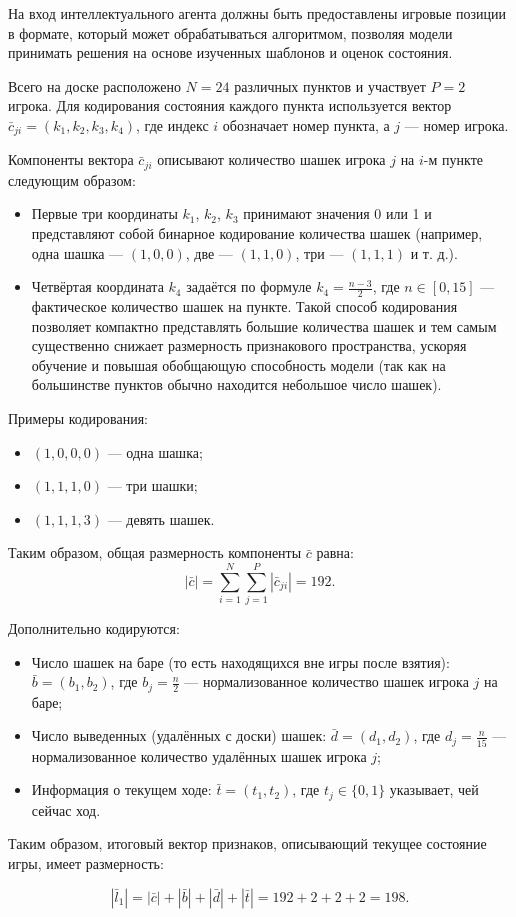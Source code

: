 На вход интеллектуального агента должны быть предоставлены игровые позиции в формате, который может обрабатываться алгоритмом, позволяя модели принимать решения на основе изученных шаблонов и оценок состояния.

Всего на доске расположено $N = 24$ различных пунктов и участвует $P = 2$ игрока. Для кодирования состояния каждого пункта используется вектор $\bar{c}_{ji} = (k_1, k_2, k_3, k_4)$, где индекс $i$ обозначает номер пункта, а $j$ --- номер игрока.

Компоненты вектора $\bar{c}_{ji}$ описывают количество шашек игрока $j$ на $i$-м пункте следующим образом:
\begin{itemize}
    \item Первые три координаты $k_1$, $k_2$, $k_3$ принимают значения 0 или 1 и представляют собой бинарное кодирование количества шашек (например, одна шашка --- $(1, 0, 0)$, две --- $(1, 1, 0)$, три --- $(1, 1, 1)$ и т. д.).
    \item Четвёртая координата $k_4$ задаётся по формуле $k_4 = \frac{n - 3}{2}$, где $n \in [0, 15]$ --- фактическое количество шашек на пункте. Такой способ кодирования позволяет компактно представлять большие количества шашек и тем самым существенно снижает размерность признакового пространства, ускоряя обучение и повышая обобщающую способность модели (так как на большинстве пунктов обычно находится небольшое число шашек).
\end{itemize}

Примеры кодирования:
\begin{itemize}
    \item $(1, 0, 0, 0)$ --- одна шашка;
    \item $(1, 1, 1, 0)$ --- три шашки;
    \item $(1, 1, 1, 3)$ --- девять шашек.
\end{itemize}

Таким образом, общая размерность компоненты $\bar{c}$ равна:
\begin{equation}
    |\bar{c}| = \sum\limits_{i=1}^{N} \sum\limits_{j=1}^{P} |\bar{c}_{ji}| = 192.
\end{equation}

Дополнительно кодируются:
\begin{itemize}
    \item Число шашек на баре (то есть находящихся вне игры после взятия): $\bar{b} = (b_1, b_2)$, где $b_j = \frac{n}{2}$ --- нормализованное количество шашек игрока $j$ на баре;
    \item Число выведенных (удалённых с доски) шашек: $\bar{d} = (d_1, d_2)$, где $d_j = \frac{n}{15}$ --- нормализованное количество удалённых шашек игрока $j$;
    \item Информация о текущем ходе: $\bar{t} = (t_1, t_2)$, где $t_j \in \{0, 1\}$ указывает, чей сейчас ход.
\end{itemize}

Таким образом, итоговый вектор признаков, описывающий текущее состояние игры, имеет размерность:

\begin{equation}
    |\bar{l}_1| = |\bar{c}| + |\bar{b}| + |\bar{d}| + |\bar{t}| = 192 + 2 + 2 + 2 = 198.
\end{equation}
